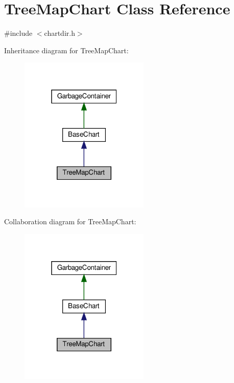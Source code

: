 \hypertarget{class_tree_map_chart}{}\section{Tree\+Map\+Chart Class Reference}
\label{class_tree_map_chart}


{\ttfamily \#include $<$chartdir.\+h$>$}



Inheritance diagram for Tree\+Map\+Chart\+:
\nopagebreak
\begin{figure}[H]
\begin{center}
\leavevmode
\includegraphics[width=175pt]{class_tree_map_chart__inherit__graph}
\end{center}
\end{figure}


Collaboration diagram for Tree\+Map\+Chart\+:
\nopagebreak
\begin{figure}[H]
\begin{center}
\leavevmode
\includegraphics[width=175pt]{class_tree_map_chart__coll__graph}
\end{center}
\end{figure}
